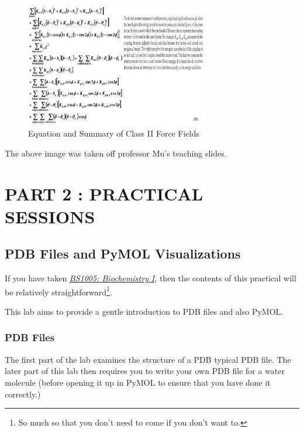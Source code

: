 \documentclass[
  letterpaper,
  DIV=11,
  numbers=noendperiod]{scrreprt}
\begin{document}
\begin{figure}

{\centering \includegraphics[width=3.16in,height=\textheight]{./images/wk2/classii.jpg}

}

\caption{Equation and Summary of Class II Force Fields}

\end{figure}

The above image was taken off professor Mu's teaching slides.

\part{\textbf{PART 2 : PRACTICAL SESSIONS}}

\hypertarget{pdb-files-and-pymol-visualizations}{%
\chapter{PDB Files and PyMOL
Visualizations}\label{pdb-files-and-pymol-visualizations}}

If you have taken
\href{https://labs.sbs.ntu.edu.sg/obtl/obtl.aspx?sch=sbs\&p=BS1005}{\emph{BS1005:
Biochemistry I}}, then the contents of this practical will be relatively
straightforward\footnote{So much so that you don't need to come if you
  don't want to.}.

This lab aims to provide a gentle introduction to PDB files and also
PyMOL.

\hypertarget{pdb-files}{%
\section{PDB Files}\label{pdb-files}}

The first part of the lab examines the structure of a PDB typical PDB
file. The later part of this lab then requires you to write your own PDB
file for a water molecule (before opening it up in PyMOL to ensure that
you have done it correctly.)
\end{document}
